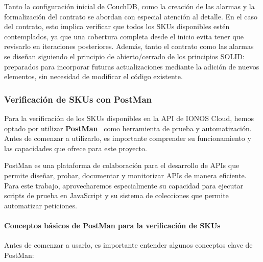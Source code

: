 Tanto la configuración inicial de CouchDB, como la creación de las alarmas y la formalización del contrato se abordan con especial atención al detalle. En el caso del contrato, esto implica verificar que todos los SKUs disponibles estén contemplados, ya que una cobertura completa desde el inicio evita tener que revisarlo en iteraciones posteriores. Además, tanto el contrato como las alarmas se diseñan siguiendo el principio de abierto/cerrado de los principios SOLID: preparados para incorporar futuras actualizaciones mediante la adición de nuevos elementos, sin necesidad de modificar el código existente.

\vspace{1cm}

\subsubsection{Verificación de SKUs con PostMan}
Para la verificación de los SKUs disponibles en la API de IONOS Cloud, hemos optado por utilizar
\textbf{PostMan}~\Cite{PostMan-Learning} como herramienta de prueba y automatización. Antes de comenzar a utilizarlo, es
importante comprender su funcionamiento y las capacidades que ofrece para este proyecto.

PostMan es una plataforma de colaboración para el desarrollo de APIs que permite diseñar, probar,
documentar y monitorizar APIs de manera eficiente. Para este trabajo, aprovecharemos especialmente
su capacidad para ejecutar scripts de prueba en JavaScript y su sistema de colecciones que permite
automatizar peticiones.

\paragraph{Conceptos básicos de PostMan para la verificación de SKUs}

Antes de comenzar a usarlo, es importante entender algunos conceptos
clave de PostMan:

